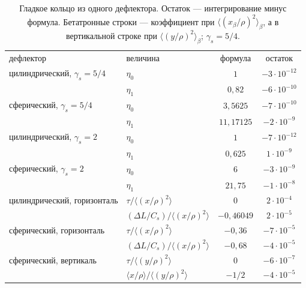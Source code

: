 \begin{table}
\caption{Гладкое кольцо из одного дефлектора. Остаток --- интегрирование минус формула. Бетатронные строки --- коэффициент при $\langle(x_\beta/\rho)^2\rangle_\beta$, а в вертикальной строке при $\langle(y/\rho)^2\rangle_\beta$; $\gamma_s=5/4$.}
\label{tab:es-num}
\begin{ruledtabular}
\begin{tabular}{llcc}
дефлектор & величина & формула & остаток \\
\colrule
цилиндрический, $\gamma_s=5/4$ & $\eta_0$ & $1$ & $-3\cdot 10^{-12}$ \\
 & $\eta_1$ & $0{,}82$ & $-6\cdot 10^{-10}$ \\
сферический, $\gamma_s=5/4$ & $\eta_0$ & $3{,}5625$ & $-7\cdot 10^{-10}$ \\
 & $\eta_1$ & $11{,}17125$ & $-2\cdot 10^{-9}$ \\
цилиндрический, $\gamma_s=2$ & $\eta_0$ & $1$ & $-7\cdot 10^{-12}$ \\
 & $\eta_1$ & $0{,}625$ & $1\cdot 10^{-9}$ \\
сферический, $\gamma_s=2$ & $\eta_0$ & $6$ & $-3\cdot 10^{-9}$ \\
 & $\eta_1$ & $21{,}75$ & $-1\cdot 10^{-8}$ \\
\colrule
цилиндрический, горизонталь & $\tau\big/\langle(x/\rho)^2\rangle$ & $0$ & $2\cdot 10^{-4}$ \\
 & $(\Delta L/C_s)\big/\langle(x/\rho)^2\rangle$ & $-0{,}46049$ & $2\cdot 10^{-5}$ \\
сферический, горизонталь & $\tau\big/\langle(x/\rho)^2\rangle$ & $-0{,}36$ & $-7\cdot 10^{-5}$ \\
 & $(\Delta L/C_s)\big/\langle(x/\rho)^2\rangle$ & $-0{,}68$ & $-4\cdot 10^{-5}$ \\
сферический, вертикаль & $\tau\big/\langle(y/\rho)^2\rangle$ & $0$ & $-6\cdot 10^{-7}$ \\
 & $\langle x/\rho\rangle\big/\langle(y/\rho)^2\rangle$ & $-1/2$ & $-4\cdot 10^{-5}$ \\
\end{tabular}
\end{ruledtabular}
\end{table}
